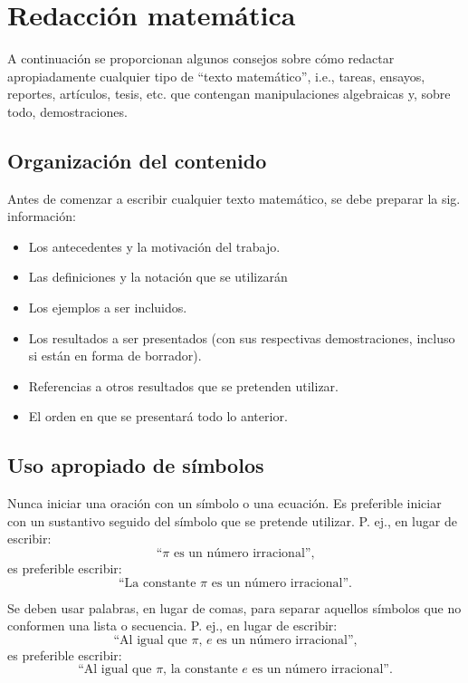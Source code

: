 \chapter{Redacción matemática}

A continuación se proporcionan algunos consejos sobre cómo redactar apropiadamente cualquier tipo de ``texto matemático'', i.e., tareas, ensayos, reportes, artículos, tesis, etc. que contengan manipulaciones algebraicas y, sobre todo, demostraciones.


\section{Organización del contenido}

Antes de comenzar a escribir cualquier texto matemático, se debe preparar la sig. información:

\begin{itemize}
  \item Los antecedentes y la motivación del trabajo.
  \item Las definiciones y la notación que se utilizarán
  \item Los ejemplos a ser incluidos.
  \item Los resultados a ser presentados (con sus respectivas demostraciones, incluso si están en forma de borrador).
  \item Referencias a otros resultados que se pretenden utilizar.
  \item El orden en que se presentará todo lo anterior.
\end{itemize}


\section{Uso apropiado de símbolos}

Nunca iniciar una oración con un símbolo o una ecuación. 
Es preferible iniciar con un sustantivo seguido del símbolo que se pretende utilizar.
P. ej., en lugar de escribir:
\[
  \text{``}\pi\text{ es un número irracional'',}
\]
es preferible escribir:
\[
  \text{``La constante }\pi\text{ es un número irracional''.}
\]

Se deben usar palabras, en lugar de comas, para separar aquellos símbolos que no conformen una lista o secuencia.
P. ej., en lugar de escribir:
\[
  \text{``Al igual que }\pi\text{, }e\text{ es un número irracional'',}
\]
es preferible escribir:
\[
  \text{``Al igual que }\pi\text{, la constante }e\text{ es un número irracional''.}
\]

